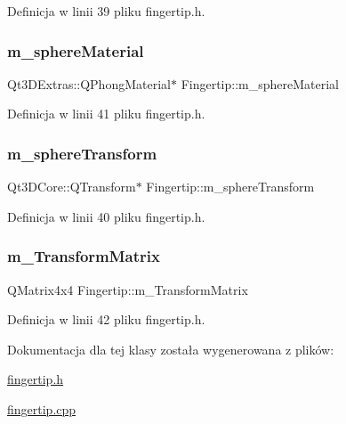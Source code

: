 Definicja w linii 39 pliku fingertip.\+h.

\mbox{\label{class_fingertip_a58602637fb13017b27b8c635e614d1f5}} 
\subsubsection{\texorpdfstring{m\+\_\+sphere\+Material}{m\_sphereMaterial}}
{\footnotesize\ttfamily Qt3\+D\+Extras\+::\+Q\+Phong\+Material$\ast$ Fingertip\+::m\+\_\+sphere\+Material\hspace{0.3cm}{\ttfamily [protected]}}



Definicja w linii 41 pliku fingertip.\+h.

\mbox{\label{class_fingertip_a0827f0c8eee7e8327d5ad8f74a2bc321}} 
\subsubsection{\texorpdfstring{m\+\_\+sphere\+Transform}{m\_sphereTransform}}
{\footnotesize\ttfamily Qt3\+D\+Core\+::\+Q\+Transform$\ast$ Fingertip\+::m\+\_\+sphere\+Transform\hspace{0.3cm}{\ttfamily [protected]}}



Definicja w linii 40 pliku fingertip.\+h.

\mbox{\label{class_fingertip_aeb9e6a84d8edba93cabbddafbcba04b2}} 
\subsubsection{\texorpdfstring{m\+\_\+\+Transform\+Matrix}{m\_TransformMatrix}}
{\footnotesize\ttfamily Q\+Matrix4x4 Fingertip\+::m\+\_\+\+Transform\+Matrix\hspace{0.3cm}{\ttfamily [protected]}}



Definicja w linii 42 pliku fingertip.\+h.



Dokumentacja dla tej klasy została wygenerowana z plików\+:\begin{DoxyCompactItemize}
\item 
\hyperlink{fingertip_8h}{fingertip.\+h}\item 
\hyperlink{fingertip_8cpp}{fingertip.\+cpp}\end{DoxyCompactItemize}
